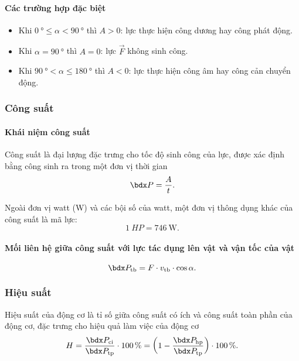\begin{tomtat}
	\paragraph{Các trường hợp đặc biệt}
	\begin{itemize}
		\item Khi $\SI{0}{\degree}\leq \alpha<\SI{90}{\degree}$ thì $A>0$: lực thực hiện công dương hay công phát động.
		\item Khi $\alpha=\SI{90}{\degree}$ thì $A=0$: lực $\vec{F}$ không sinh công.
		\item Khi $\SI{90}{\degree}< \alpha\leq\SI{180}{\degree}$ thì $A<0$: lực thực hiện công âm hay công cản chuyển động.
	\end{itemize}
	\subsubsection{Công suất}
	\paragraph{Khái niệm công suất}
	\begin{dn}
		Công suất là đại lượng đặc trưng cho tốc độ sinh công của lực, được xác định bằng công sinh ra trong một đơn vị thời gian
		$$\calP=\dfrac{A}{t}.$$
	\end{dn}
\begin{note}
	Ngoài đơn vị watt (\si{\watt}) và các bội số của watt, một đơn vị thông dụng khác của công suất là mã lực:
	$$\SI{1}{HP}=\SI{746}{\watt}.$$
\end{note}
\paragraph{Mối liên hệ giữa công suất với lực tác dụng lên vật và vận tốc của vật}
\begin{boxdn}
	$$\calP_{\mathrm{tb}}=F\cdot v_{\mathrm{tb}}\cdot\cos\alpha.$$
\end{boxdn}
\subsubsection{Hiệu suất}
\begin{dn}
	Hiệu suất của động cơ là tỉ số giữa công suất có ích và công suất toàn phần của động cơ, đặc trưng cho hiệu quả làm việc của động cơ
	$$H=\dfrac{\calP_{\mathrm{ci}}}{\calP_{\mathrm{tp}}}\cdot\SI{100}{\percent}=\left(1-\dfrac{\calP_{\mathrm{hp}}}{\calP_{\mathrm{tp}}}\right)\cdot\SI{100}{\percent}.$$
\end{dn}

\end{tomtat}
